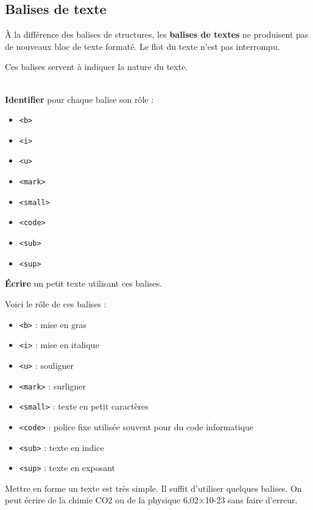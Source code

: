 \documentclass[a4paper,17pt]{extarticle}
\newenvironment{eleve}%
{\begin{activite}\color{noiramu}\\}
{\end{activite}}
\providecommand{\tightlist}{%
      \setlength{\itemsep}{0pt}\setlength{\parskip}{0pt}}
\begin{document}
    \hypertarget{balises-de-texte}{%
\subsection{Balises de texte}\label{balises-de-texte}}

    À la différence des balises de structures, les \textbf{balises de
textes} ne produisent pas de nouveaux bloc de texte formaté. Le flot du
texte n'est pas interrompu.

Ces balises servent à indiquer la nature du texte.
\begin{eleve}
    \textbf{Identifier} pour chaque balise son rôle :

\begin{itemize}
\tightlist
\item
  \texttt{\textless{}b\textgreater{}}
\item
  \texttt{\textless{}i\textgreater{}}
\item
  \texttt{\textless{}u\textgreater{}}
\item
  \texttt{\textless{}mark\textgreater{}}
\item
  \texttt{\textless{}small\textgreater{}}
\item
  \texttt{\textless{}code\textgreater{}}
\item
  \texttt{\textless{}sub\textgreater{}}
\item
  \texttt{\textless{}sup\textgreater{}}
\end{itemize}

\textbf{Écrire} un petit texte utilisant ces balises.
        
        \end{eleve}\begin{reponse}
    Voici le rôle de ces balises :

\begin{itemize}
\tightlist
\item
  \texttt{\textless{}b\textgreater{}} : mise en gras
\item
  \texttt{\textless{}i\textgreater{}} : mise en italique
\item
  \texttt{\textless{}u\textgreater{}} : souligner
\item
  \texttt{\textless{}mark\textgreater{}} : surligner
\item
  \texttt{\textless{}small\textgreater{}} : texte en petit caractères
\item
  \texttt{\textless{}code\textgreater{}} : police fixe utilisée souvent
  pour du code informatique
\item
  \texttt{\textless{}sub\textgreater{}} : texte en indice
\item
  \texttt{\textless{}sup\textgreater{}} : texte en exposant
\end{itemize}

Mettre en forme un texte est très simple. Il suffit d'utiliser quelques
balises. On peut écrire de la chimie CO2 ou de la physique 6,02×10-23
sans faire d'erreur.

            \end{reponse}
\end{document}
